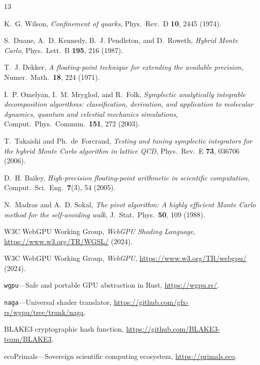 \documentclass[aps,prl,twocolumn,superscriptaddress,showpacs]{revtex4-2}
\begin{document}

\begin{thebibliography}{13}

K.~G. Wilson,
\textit{Confinement of quarks},
Phys.\ Rev.\ D \textbf{10}, 2445 (1974).

S.~Duane, A.~D. Kennedy, B.~J. Pendleton, and D.~Roweth,
\textit{Hybrid Monte Carlo},
Phys.\ Lett.\ B \textbf{195}, 216 (1987).

T.~J. Dekker,
\textit{A floating-point technique for extending the available precision},
Numer.\ Math.\ \textbf{18}, 224 (1971).

I.~P. Omelyan, I.~M. Mryglod, and R.~Folk,
\textit{Symplectic analytically integrable decomposition algorithms:
  classification, derivation, and application to molecular dynamics,
  quantum and celestial mechanics simulations},
Comput.\ Phys.\ Commun.\ \textbf{151}, 272 (2003).

T.~Takaishi and Ph.~de~Forcrand,
\textit{Testing and tuning symplectic integrators for the hybrid Monte
  Carlo algorithm in lattice QCD},
Phys.\ Rev.\ E \textbf{73}, 036706 (2006).

D.~H. Bailey,
\textit{High-precision floating-point arithmetic in scientific computation},
Comput.\ Sci.\ Eng.\ \textbf{7}(3), 54 (2005).

N.~Madras and A.~D. Sokal,
\textit{The pivot algorithm: A highly efficient Monte Carlo method for
  the self-avoiding walk},
J.\ Stat.\ Phys.\ \textbf{50}, 109 (1988).

W3C WebGPU Working Group,
\textit{WebGPU Shading Language},
\url{https://www.w3.org/TR/WGSL/} (2024).

W3C WebGPU Working Group,
\textit{WebGPU},
\url{https://www.w3.org/TR/webgpu/} (2024).

\texttt{wgpu}---Safe and portable GPU abstraction in Rust,
\url{https://wgpu.rs/}.

\texttt{naga}---Universal shader translator,
\url{https://github.com/gfx-rs/wgpu/tree/trunk/naga}.

BLAKE3 cryptographic hash function,
\url{https://github.com/BLAKE3-team/BLAKE3}.

ecoPrimals---Sovereign scientific computing ecosystem,
\url{https://primals.eco}.

\end{thebibliography}
\end{document}
